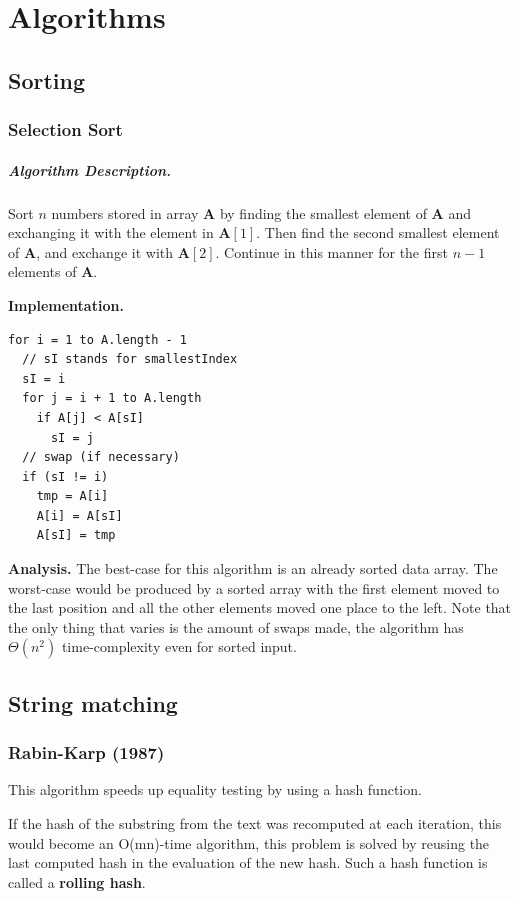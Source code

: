 \documentclass[oneside]{book} %
\theoremstyle{plain}
\begin{document}
\chapter{Algorithms}

\section{Sorting}
\subsection{Selection Sort}
\paragraph{Algorithm Description.} Sort \(n\) numbers stored in array
\(\mathbf{A}\) by finding the smallest element of \(\mathbf{A}\) and exchanging
it with the element in \(\mathbf{A}[1]\). Then find the second smallest element
of \(\mathbf{A}\), and exchange it with \(\mathbf{A}[2]\). Continue in this
manner for the first \(n - 1\) elements of \(\mathbf{A}\).

\textbf{Implementation.}

\begin{lstlisting}
for i = 1 to A.length - 1
  // sI stands for smallestIndex
  sI = i
  for j = i + 1 to A.length
    if A[j] < A[sI]
      sI = j
  // swap (if necessary)
  if (sI != i)
    tmp = A[i]
    A[i] = A[sI]
    A[sI] = tmp
\end{lstlisting}

\textbf{Analysis.} The best-case for this algorithm is an already sorted data
array. The worst-case would be produced by a sorted array with the first element
moved to the last position and all the other elements moved one place to the
left. Note that the only thing that varies is the amount of swaps made, the
algorithm has \(\Theta(n^2)\) time-complexity even for sorted input.

\section{String matching}
\subsection{Rabin-Karp (1987)}
This algorithm speeds up equality testing by using a hash function.

If the hash of the substring from the text was recomputed at each iteration,
this would become an O(mn)-time algorithm, this problem is solved by reusing
the last computed hash in the evaluation of the new hash. Such a hash function
is called a \textbf{rolling hash}.
\end{document}
